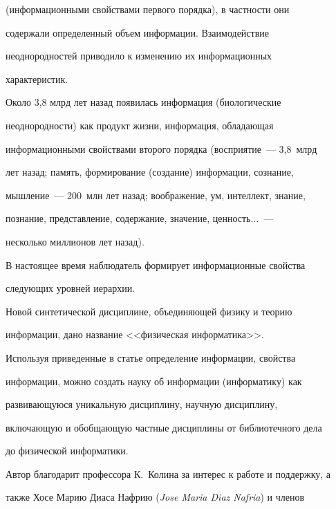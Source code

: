 (информационными свойствами первого порядка), в частности они 


содержали определенный объем информации. Взаимодействие 


неоднородностей приводило к изменению их информационных 


характеристик.


   


Около   3,8 млрд лет назад появилась информация (биологические 


неоднородности) как продукт жизни, информация, обладающая 


информационными свойствами второго порядка (восприятие~--- 3,8~млрд


лет назад; память, формирование (создание) информации, сознание, 


мышление~--- 200~млн лет назад; воображение, ум, интеллект, знание, 


познание, представление, содержание, значение, ценность$\ldots$~--- 


несколько миллионов лет назад).


   


   В настоящее время наблюдатель формирует информационные свойства 


следующих уровней иерархии.


   


   Новой синтетической дисциплине, объединяющей физику и теорию 


информации, дано название <<физическая информатика>>.


   


   Используя приведенные в статье определение информации, свойства 


информации, можно создать науку об информации (информатику) как 


развивающуюся уникальную дисциплину, научную дисциплину, 


включающую и обобщающую частные дисциплины от библиотечного дела 


до физической информатики.





\bigskip


Автор благодарит профессора К.~Колина за интерес к работе и поддержку, а 


также Хосе Марию Диаса Нафрию (\textit{Jose Maria Diaz Nafria}) и членов 


